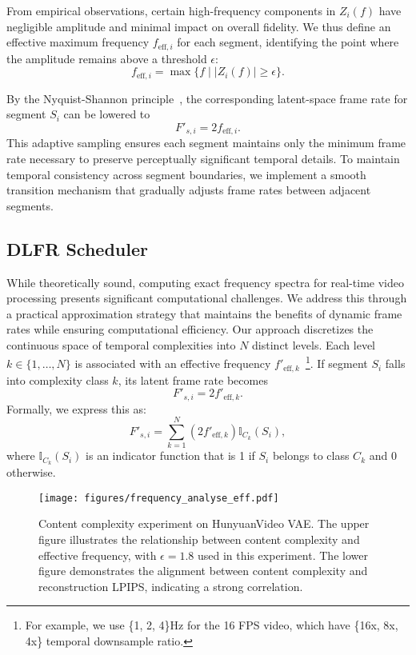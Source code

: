 From empirical observations, certain high-frequency components in $Z_i(f)$ have negligible amplitude and minimal impact on overall fidelity. We thus define an effective maximum frequency $f_{\text{eff},i}$ for each segment, identifying the point where the amplitude remains above a threshold $\epsilon$:
\begin{equation}
f_{\text{eff},i} = \max\{f \mid |Z_i(f)| \geq \epsilon\}.
\end{equation}

By the Nyquist-Shannon principle~\cite{ash2012information}, the corresponding latent-space frame rate for segment $S_i$ can be lowered to
\begin{equation}
F'_{s,i} = 2f_{\text{eff},i}.
\end{equation}
This adaptive sampling ensures each segment maintains only the minimum frame rate necessary to preserve perceptually significant temporal details. To maintain temporal consistency across segment boundaries, we implement a
smooth transition mechanism that gradually adjusts frame
rates between adjacent segments.


\subsection{DLFR Scheduler} 
\label{subsec:dflr_Scheduler} 
While theoretically sound, computing exact frequency spectra for real-time video processing presents significant computational challenges. We address this through a practical approximation strategy that maintains the benefits of dynamic frame rates while ensuring computational efficiency. Our approach discretizes the continuous space of temporal complexities into $N$ distinct levels.
Each level $k \in \{1,\ldots,N\}$ is associated with an effective frequency $f'_{\text{eff},k}$~\footnote{For example, we use \{1, 2, 4\}Hz for the 16 FPS video, which have \{16x, 8x, 4x\} temporal downsample ratio.}. %
If segment $S_i$ falls into complexity class $k$, its latent frame rate becomes
\begin{equation}
F'_{s,i} = 2f'_{\text{eff},k}.
\end{equation}
Formally, we express this as:
\begin{equation}
F'_{s,i} = \sum_{k=1}^N (2f'_{\text{eff},k}) \mathbb{I}_{C_k}(S_i),
\end{equation}
where $\mathbb{I}_{C_k}(S_i)$ is an indicator function that is 1 if $S_i$ belongs to class $C_k$ and 0 otherwise.

\begin{figure}[!tb] %
    \centering
    \texttt{[image: figures/frequency\_analyse\_eff.pdf]} %
    \caption{Content complexity experiment on HunyuanVideo VAE. The upper figure illustrates the relationship between content complexity and effective frequency, with  $\epsilon=1.8$ used in this experiment. The lower figure demonstrates the alignment between content complexity and reconstruction LPIPS, indicating a strong correlation.}
    \label{im_content_complexity}
\end{figure}

